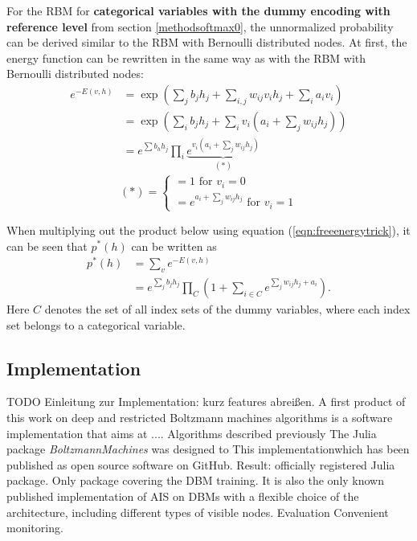 \documentclass[12pt]{article}
\newcommand{\apkg}[1]{\emph{#1}}
\begin{document}
For the RBM for {\bf categorical variables with the dummy encoding with reference level} from section \ref{methodsoftmax0}, the unnormalized probability can be derived similar to the RBM with Bernoulli distributed nodes. At first, the energy function can be rewritten in the same way as with the RBM with Bernoulli distributed nodes:
\begin{align}
e^{-E(v,h)} &= \exp \left(\sum_j b_j h_j + \sum_{i,j} w_{ij} v_i h_j + \sum_i a_i v_i \right) \nonumber \\
&= \exp \left( \sum_i b_j h_j + \sum_i v_i \left( a_i + \sum_j w_{ij} h_j \right) \right) \nonumber \\
&= e^{\sum b_h h_j} \prod_i \underbrace{e^{v_i (a_i + \sum_j w_{ij} h_j)}}_{(*)}
\label{eqn:freeenergytrick}
\end{align}
\begin{equation*}
(*) = \left\{
\begin{array}{l}
 =1 \text{ for } v_i = 0 \\
 = e^{a_i +\sum_j w_{ij} h_j} \text{ for } v_i = 1 
\end{array} \right.
\end{equation*}

When multiplying out the product below using equation (\ref{eqn:freeenergytrick}), it can be seen that $p^*(h)$ can be written as
\begin{align*}
p^*(h) &= \sum_v e^{-E(v,h)} \\
&= e^{\sum_j b_j h_j} \prod_{C} \left( 1 + \sum_{i \in C} e^{\sum_j w_{ij} h_j + a_i} \right).
\end{align*}
Here $C$ denotes the set of all index sets of the dummy variables, where each index set belongs to a categorical variable.

\subsection{Implementation}
TODO Einleitung zur Implementation: kurz features abreißen.
A first product of this work on deep and restricted Boltzmann machines algorithms is a software implementation that aims at  ....
Algorithms described previously 
The Julia package \apkg{BoltzmannMachines} was designed to 
This implementationwhich has been published as open source software on GitHub.
Result: officially registered Julia package. Only package covering the DBM training.
It is also the only known published implementation of AIS on DBMs with a flexible choice of the architecture, including different types of visible nodes.
Evaluation Convenient monitoring.
\end{document}
